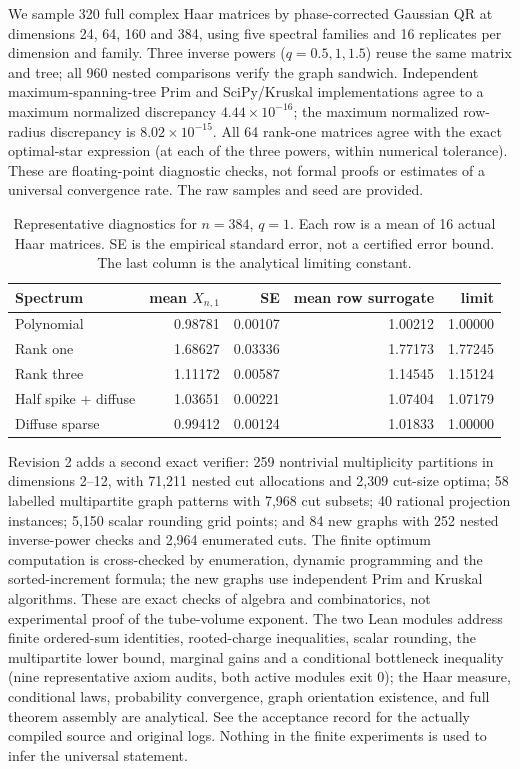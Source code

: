 \documentclass[11pt]{article}
\begin{document}
We sample 320 full complex Haar matrices by phase-corrected Gaussian QR at dimensions 24, 64, 160 and 384, using five spectral families and 16 replicates per dimension and family. Three inverse powers ($q=0.5,1,1.5$) reuse the same matrix and tree; all 960 nested comparisons verify the graph sandwich. Independent maximum-spanning-tree Prim and SciPy/Kruskal implementations agree to a maximum normalized discrepancy $4.44\times10^{-16}$; the maximum normalized row-radius discrepancy is $8.02\times10^{-15}$. All 64 rank-one matrices agree with the exact optimal-star expression (at each of the three powers, within numerical tolerance). These are floating-point diagnostic checks, not formal proofs or estimates of a universal convergence rate. The raw samples and seed are provided.

\begin{table}[ht]
\centering
\caption{Representative diagnostics for $n=384$, $q=1$. Each row is a mean of 16 actual Haar matrices. SE is the empirical standard error, not a certified error bound. The last column is the analytical limiting constant.}
\label{tab:diagnostics}
\begin{tabular}{lrrrr}
\toprule
Spectrum & mean $X_{n,1}$ & SE & mean row surrogate & limit\\
\midrule
Polynomial & 0.98781 & 0.00107 & 1.00212 & 1.00000\\
Rank one & 1.68627 & 0.03336 & 1.77173 & 1.77245\\
Rank three & 1.11172 & 0.00587 & 1.14545 & 1.15124\\
Half spike + diffuse & 1.03651 & 0.00221 & 1.07404 & 1.07179\\
Diffuse sparse & 0.99412 & 0.00124 & 1.01833 & 1.00000\\
\bottomrule
\end{tabular}
\end{table}

Revision 2 adds a second exact verifier: 259 nontrivial multiplicity partitions in dimensions 2--12, with 71,211 nested cut allocations and 2,309 cut-size optima; 58 labelled multipartite graph patterns with 7,968 cut subsets; 40 rational projection instances; 5,150 scalar rounding grid points; and 84 new graphs with 252 nested inverse-power checks and 2,964 enumerated cuts. The finite optimum computation is cross-checked by enumeration, dynamic programming and the sorted-increment formula; the new graphs use independent Prim and Kruskal algorithms. These are exact checks of algebra and combinatorics, not experimental proof of the tube-volume exponent. The two Lean modules address finite ordered-sum identities, rooted-charge inequalities, scalar rounding, the multipartite lower bound, marginal gains and a conditional bottleneck inequality (nine representative axiom audits, both active modules exit 0); the Haar measure, conditional laws, probability convergence, graph orientation existence, and full theorem assembly are analytical. See the acceptance record for the actually compiled source and original logs. Nothing in the finite experiments is used to infer the universal statement.
\end{document}
